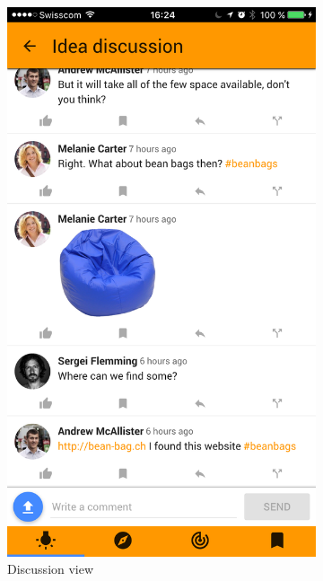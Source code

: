\documentclass[a4paper,12pt, oneside]{article}
\begin{document}
\begin{figure}[!htb]
\begin{subfigure}[t]{.32\textwidth}
        \includegraphics[width=\textwidth]{images/ideaDiscussion.png}
        \caption{Discussion view}
        \label{fig.idea.discussion}
    \end{subfigure}
    \hfill
    \begin{subfigure}[t]{.32\textwidth}

\end{subfigure}
\end{figure}
\end{document}
